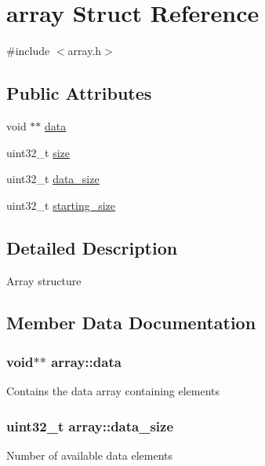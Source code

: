 \hypertarget{structarray}{}\section{array Struct Reference}
\label{structarray}


{\ttfamily \#include $<$array.\+h$>$}

\subsection*{Public Attributes}
\begin{DoxyCompactItemize}
\item 
void $\ast$$\ast$ \hyperlink{structarray_a992e4daf657b3508eb62981340a6a7d4}{data}
\item 
uint32\+\_\+t \hyperlink{structarray_a5f368728114c0d6f950988fdfd1492d1}{size}
\item 
uint32\+\_\+t \hyperlink{structarray_a87a0c4ae1ca1fd7ae9cf34ed7b260504}{data\+\_\+size}
\item 
uint32\+\_\+t \hyperlink{structarray_a6b0cfff527d88be657ec0a21363ddd75}{starting\+\_\+size}
\end{DoxyCompactItemize}


\subsection{Detailed Description}
Array structure 

\subsection{Member Data Documentation}
\hypertarget{structarray_a992e4daf657b3508eb62981340a6a7d4}{}
\subsubsection[{data}]{\setlength{\rightskip}{0pt plus 5cm}void$\ast$$\ast$ array\+::data}\label{structarray_a992e4daf657b3508eb62981340a6a7d4}
Contains the data array containing elements \hypertarget{structarray_a87a0c4ae1ca1fd7ae9cf34ed7b260504}{}
\subsubsection[{data\+\_\+size}]{\setlength{\rightskip}{0pt plus 5cm}uint32\+\_\+t array\+::data\+\_\+size}\label{structarray_a87a0c4ae1ca1fd7ae9cf34ed7b260504}
Number of available data elements \hypertarget{structarray_a5f368728114c0d6f950988fdfd1492d1}{}
